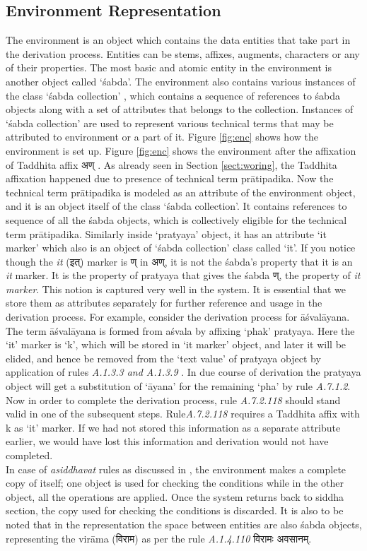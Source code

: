 \documentclass[11pt]{article}
\begin{document}
\subsection{Environment Representation}
The environment is an object which contains the data entities that take part in the derivation process. Entities can be stems, affixes, augments, characters or any of their properties. The most basic and atomic entity in the environment is another object called `śabda'. The environment also contains various instances of the class `śabda collection' , which contains a sequence of references to śabda objects along with a set of attributes that belongs to the collection. Instances of `śabda collection' are used to represent various technical terms that may be attributed to environment or a part of it. Figure \ref{fig:enc} shows how the environment is set up.  Figure \ref{fig:enc} shows the environment after the affixation of Taddhita affix {\skt अण् }. As already seen in Section \ref{sect:woring}, the Taddhita affixation happened due to presence of technical term prātipadika. Now the technical term prātipadika is modeled as an attribute of the environment object, and it is an object itself of the class `śabda collection'. It contains references to sequence of all the śabda objects, which is collectively eligible for the technical term prātipadika. Similarly inside `pratyaya' object, it has an attribute `it marker' which also is an object of `śabda collection' class called `it'. If you notice though the {\sl it} ({\skt इत्}) marker is {\skt ण् in अण्}, it is not the śabda's property that it is an {\sl it} marker. It is the property of pratyaya that gives the śabda {\skt ण्}, the property of {\sl it marker}. This notion is captured very well in the system. It is essential that we store them as attributes separately for further reference and usage in the derivation process. For example, consider the derivation process for āśvalāyana. The term āśvalāyana is formed from aśvala by affixing `phak' pratyaya. Here the `it' marker is `k', which will be stored in `it marker' object, and later it will be elided, and hence be removed from the `text value' of pratyaya object by application of rules {\sl A.1.3.3 and A.1.3.9} . In due course of derivation the pratyaya object will get a substitution of `āyana' for the remaining `pha' by rule {\sl A.7.1.2}. Now in order to complete the derivation process, rule {\sl A.7.2.118} should stand valid in one of the subsequent steps. Rule{\sl A.7.2.118} requires a Taddhita affix with k as `it' marker. If we had not stored this information as a separate attribute earlier, we would have lost this information and derivation would not have completed.  \\     In case of {\sl asiddhavat} rules as discussed in , the environment makes a complete copy of itself; one object is used for checking the conditions while in the other object, all the operations are applied. Once the system returns back to siddha section, the copy used for checking the conditions is discarded. It is also to be noted that in the representation the space between entities are also śabda objects, representing the virāma ({\skt विराम}) as per the rule {\sl A.1.4.110} {\skt विरामः अवसानम्}.
\end{document}
